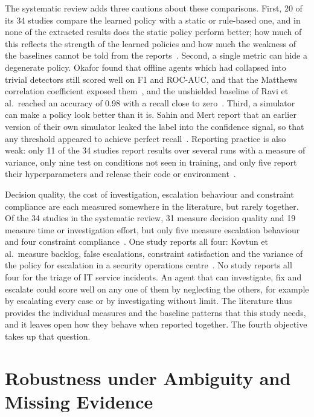 The systematic review adds three cautions about these comparisons. First, 20 of its 34 studies compare the learned policy with a static or rule-based one, and in none of the extracted results does the static policy perform better; how much of this reflects the strength of the learned policies and how much the weakness of the baselines cannot be told from the reports~\cite{opol2026slr}. Second, a single metric can hide a degenerate policy. Okafor found that offline agents which had collapsed into trivial detectors still scored well on F1 and ROC-AUC, and that the Matthews correlation coefficient exposed them~\cite{okafor2026}, and the unshielded baseline of Ravi et al.\ reached an accuracy of 0.98 with a recall close to zero~\cite{ravi2025}. Third, a simulator can make a policy look better than it is. Sahin and Mert report that an earlier version of their own simulator leaked the label into the confidence signal, so that any threshold appeared to achieve perfect recall~\cite{sahin2026}. Reporting practice is also weak: only 11 of the 34 studies report results over several runs with a measure of variance, only nine test on conditions not seen in training, and only five report their hyperparameters and release their code or environment~\cite{opol2026slr}.

Decision quality, the cost of investigation, escalation behaviour and constraint compliance are each measured somewhere in the literature, but rarely together. Of the 34 studies in the systematic review, 31 measure decision quality and 19 measure time or investigation effort, but only five measure escalation behaviour and four constraint compliance~\cite{opol2026slr}. One study reports all four: Kovtun et al.\ measure backlog, false escalations, constraint satisfaction and the variance of the policy for escalation in a security operations centre~\cite{kovtun2026}. No study reports all four for the triage of IT service incidents. An agent that can investigate, fix and escalate could score well on any one of them by neglecting the others, for example by escalating every case or by investigating without limit. The literature thus provides the individual measures and the baseline patterns that this study needs, and it leaves open how they behave when reported together. The fourth objective takes up that question.

\section{Robustness under Ambiguity and Missing Evidence}

